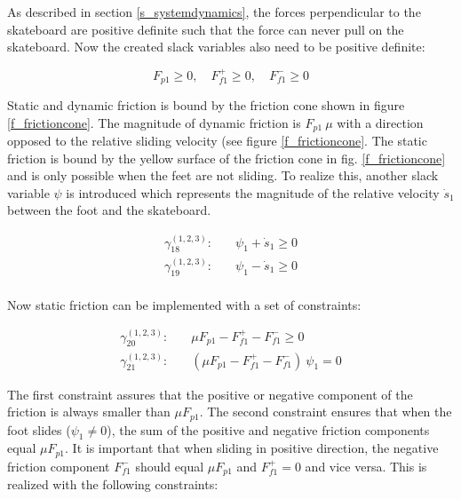 \documentclass[default,iicol]{sn-jnl}
\theoremstyle{thmstyleone}%
\theoremstyle{thmstyletwo}%
\theoremstyle{thmstylethree}%
\begin{document}
As described in section \ref{s_systemdynamics}, the forces perpendicular to the skateboard are positive definite such that the force can never pull on the skateboard. Now the created slack variables also need to be positive definite:

\begin{equation}
    F_{p1} \geq 0,\quad F_{f1}^+ \geq 0,\quad F_{f1}^- \geq 0  
\end{equation}

Static and dynamic friction is bound by the friction cone shown in figure \ref{f_frictioncone}. The magnitude of dynamic friction is $F_{p1}\ \mu$ with a direction opposed to the relative sliding velocity (see figure \ref{f_frictioncone}. The static friction is bound by the yellow surface of the friction cone in fig. \ref{f_frictioncone} and is only possible when the feet are not sliding. To realize this, another slack variable $\psi$ is introduced which represents the magnitude of the relative velocity $\dot s_1$ between the foot and the skateboard. 

\begin{equation}
\begin{split}
    \gamma_{18}^{(1,2,3)}: \quad & \psi_1 + \dot s_1  \geq 0 \\
    \gamma_{19}^{(1,2,3)}: \quad & \psi_1 - \dot s_1  \geq 0 \\
\end{split}
\end{equation}

Now static friction can be implemented with a set of constraints:

\begin{equation}
\begin{split}\label{e_frictioncontrol}
       \gamma_{20}^{(1,2,3)}: \quad & \mu F_{p1} - F_{f1}^+ - F_{f1}^- \geq 0 \\
       \gamma_{21}^{(1,2,3)}: \quad & (\mu F_{p1} - F_{f1}^+ - F_{f1}^-)\ \psi_1  = 0
\end{split}
\end{equation}

The first constraint assures that the positive or negative component of the friction is always smaller than $\mu F_{p1}$. The second constraint ensures that when the foot slides ($\psi_1 \not = 0$),  the sum of the positive and negative friction components equal $\mu F_{p1}$. It is important that when sliding in positive direction, the negative friction component $F_{f1}^-$ should equal $\mu F_{p1}$ and $F_{f1}^+=0$ and vice versa. This is realized with the following constraints:
\end{document}
